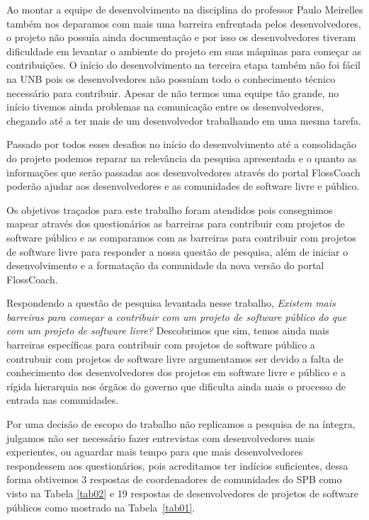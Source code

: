Ao montar a equipe de desenvolvimento na disciplina do professor Paulo Meirelles também nos deparamos
com mais uma barreira enfrentada pelos desenvolvedores, o projeto não possuía ainda 
documentação e por isso os desenvolvedores tiveram dificuldade em levantar o ambiente 
do projeto em suas máquinas para começar as contribuições. O início do desenvolvimento
na terceira etapa também não foi fácil na UNB pois os desenvolvedores não possuíam
todo o conhecimento técnico necessário para contribuir.
Apesar de não termos uma equipe tão grande, no início tivemos ainda problemas na
comunicação entre os desenvolvedores, chegando até a ter mais de um desenvolvedor 
trabalhando em uma mesma tarefa.

Passado por todos esses desafios no início do desenvolvimento até a consolidação
do projeto podemos reparar na relevância da pesquisa apresentada e o quanto as
informações que serão passadas aos desenvolvedores através do portal FlossCoach poderão
ajudar aos desenvolvedores e as comunidades de software livre e público.

Os objetivos traçados para este trabalho foram atendidos pois conseguimos 
mapear através dos questionários as barreiras para contribuir com projetos de 
software público e as comparamos com as barreiras para contribuir com projetos
de software livre para responder a nossa questão de pesquisa, além de iniciar o desenvolvimento 
e a formatação da comunidade da nova versão do portal FlossCoach. 

Respondendo a questão de pesquisa levantada nesse trabalho, \textit{Existem mais barreiras para 
começar a contribuir com um projeto de software público do que com um projeto de software 
livre?} Descobrimos que sim,
temos ainda mais barreiras específicas para contribuir com projetos de software público a contrubuir
com projetos de software livre argumentamos ser devido a falta de conhecimento dos desenvolvedores
dos projetos em software livre e público e a rígida hierarquia nos órgãos do governo
que dificulta ainda mais o processo de entrada nas comunidades.

Por uma decisão de escopo do trabalho não replicamos a pesquisa de 
 na íntegra, julgamos não ser necessário 
fazer entrevistas com desenvolvedores mais experientes, ou aguardar mais 
tempo para que mais desenvolvedores respondessem aos questionários, pois 
acreditamos ter indícios suficientes, dessa forma obtivemos 3 respostas de 
coordenadores de comunidades do SPB como visto na Tabela
\ref{tab02} e 19 respostas de desenvolvedores de projetos de software públicos 
como mostrado na Tabela~\ref{tab01}.

